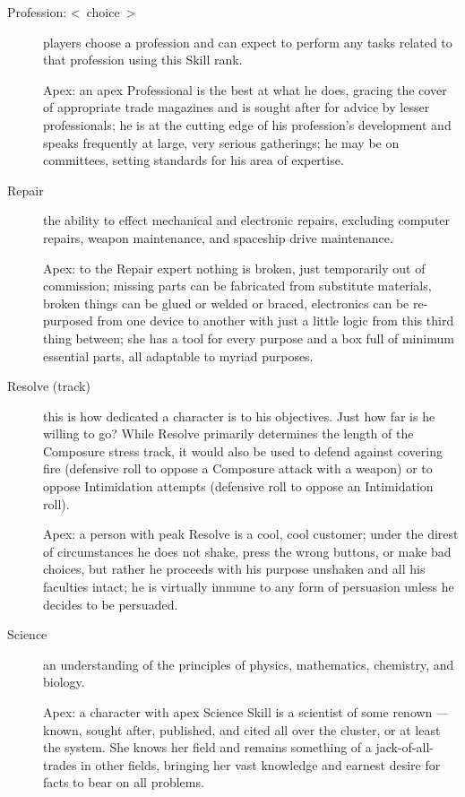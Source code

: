 \begin{description}
\item[Profession: \textless~choice~\textgreater]
players choose a profession and can expect to perform any tasks related to that profession using this Skill rank.

Apex: an apex Professional is the best at what he does, gracing the cover of appropriate trade magazines and is sought after for advice by lesser professionals; he is at the cutting edge of his profession's development and speaks frequently at large, very serious gatherings; he may be on committees, setting standards for his area of expertise.

\item[Repair]
the ability to effect mechanical and electronic repairs, excluding computer repairs, weapon maintenance, and spaceship drive maintenance.

Apex: to the Repair expert nothing is broken, just temporarily out of commission; missing parts can be fabricated from substitute materials, broken things can be glued or welded or braced, electronics can be re-purposed from one device to another with just a little logic from this third thing between; she has a tool for every purpose and a box full of minimum essential parts, all adaptable to myriad purposes.

\item[Resolve (track)]
this is how dedicated a character is to his objectives. Just how far is he willing to go? While Resolve primarily determines the length of the Composure stress track, it would also be used to defend against covering fire (defensive roll to oppose a Composure attack with a weapon) or to oppose Intimidation attempts (defensive roll to oppose an Intimidation roll).

Apex: a person with peak Resolve is a cool, cool customer; under the direst of circumstances he does not shake, press the wrong buttons, or make bad choices, but rather he proceeds with his purpose unshaken and all his faculties intact; he is virtually immune to any form of persuasion unless he decides to be persuaded.

\item[Science]
an understanding of the principles of physics, mathematics, chemistry, and biology.

Apex: a character with apex Science Skill is a scientist of some renown --- known, sought after, published, and cited all over the cluster, or at least the system. She knows her field and remains something of a jack-of-all-trades in other fields, bringing her vast knowledge and earnest desire for facts to bear on all problems.


\end{description}
